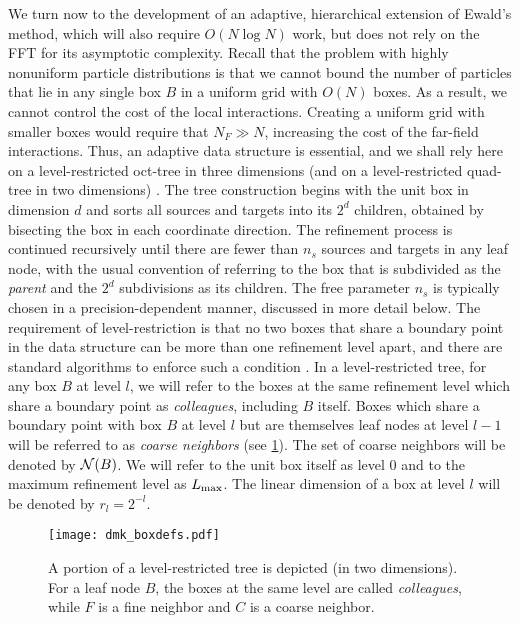 \documentclass[final,letterpaper]{siamart171218}
\newcommand{\cR}{r}
\begin{document}
We turn now to the development of an adaptive, hierarchical
extension of Ewald's method, which will also require $O(N \log N)$ work, but does
not rely on the FFT for its asymptotic complexity. 
Recall that the problem with highly nonuniform particle distributions
is that we cannot bound the number of particles that lie
in any single box $B$ in a uniform grid with $O(N)$ boxes. As a result, 
we cannot control the cost of the local interactions. 
Creating a uniform grid with smaller boxes 
would require that $N_F \gg N$, increasing the cost of the far-field 
interactions. Thus, an adaptive data structure is essential, and we
shall rely here on a level-restricted oct-tree in three dimensions
(and on a level-restricted quad-tree in two dimensions) 
\cite{biros2008sisc}. The tree construction
begins with the unit box in dimension $d$ 
and sorts all sources and targets into its $2^d$ children, obtained by bisecting
the box in each coordinate direction. The refinement process is continued
recursively until there are fewer than $n_s$ sources and targets in any 
leaf node, with the usual convention of referring to the box that is subdivided
as the {\em parent} and the $2^d$ subdivisions as its children. 
The free parameter $n_s$ is typically chosen in a precision-dependent manner,
discussed in more detail below.
The requirement of level-restriction is that no two boxes that
share a boundary point in the data structure can be more than one refinement 
level apart, and there are standard algorithms to enforce such a condition
\cite{biros2008sisc}.
In a level-restricted tree, for any box $B$ at level $l$, 
we will refer to the boxes at the same refinement level which share a
boundary point as {\em colleagues}, including
$B$ itself. 
Boxes which share a boundary point with box $B$ at level $l$ but are themselves
leaf nodes at level $l-1$ will be referred to as {\em coarse neighbors}
(see \cref{boxdefs}).
The set of coarse neighbors will be denoted by ${\cal N}(B)$.
We will refer to the unit box itself as level $0$ and to the 
maximum refinement level as $L_{\rm max}$. The linear dimension of a box at level
$l$ will be denoted by $\cR_l = 2^{-l}$.

\begin{figure}[!ht]
\centering
   \texttt{[image: dmk\_boxdefs.pdf]}
   \caption{\sf 
A portion of a level-restricted tree is depicted (in two dimensions).
For a leaf node $B$, the boxes at the same level are called {\em colleagues},
while $F$ is a fine neighbor and $C$ is a coarse neighbor.
}
\label{boxdefs}
\end{figure}
\end{document}
